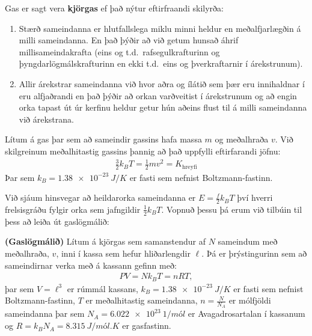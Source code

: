 \begin{tcolorbox}
\begin{definition}
Gas er sagt vera \textbf{kjörgas} ef það nýtur eftirfraandi skilyrða:
\begin{enumerate}[label = \textbf{(\roman*)}]
    \item Stærð sameindanna er hlutfallslega miklu minni heldur en meðalfjarlægðin á milli sameindanna. En það þýðir að við getum hunsað áhrif millisameindakrafta (eins og t.d.~rafsegulkrafturinn og þyngdarlögmálskrafturinn en ekki t.d.~eins og þverkraftarnir í árekstrunum).
    
    \item Allir árekstrar sameindanna við hvor aðra og ílátið sem þær eru innihaldnar í eru alfjaðrandi en það þýðir að orkan varðveitist í árekstrunum og að engin orka tapast út úr kerfinu heldur getur hún aðeins flust til á milli sameindanna við árekstrana.
\end{enumerate}
\end{definition}
\end{tcolorbox}

\begin{tcolorbox}
\begin{definition}
Lítum á gas þar sem að sameindir gassins hafa massa $m$ og meðalhraða $v$. Við skilgreinum meðalhitastig gassins þannig að það uppfylli eftirfarandi jöfnu:
\begin{align*}
  \frac{3}{2}k_B T = \frac{1}{2}mv^2 = K_{\text{hreyfi}}
\end{align*}
Þar sem $k_B = \SI{1.38e-23}{J/K}$ er fasti sem nefnist Boltzmann-fastinn.
\end{definition}
\end{tcolorbox}

Við sjáum hinsvegar að heildarorka sameindanna er $E = \frac{f}{2}k_B T$ því hverri frelsisgráðu fylgir orka sem jafngildir $\frac{1}{2}k_B T$. Vopnuð þessu þá erum við tilbúin til þess að leiða út gaslögmálið:


\begin{tcolorbox}
\begin{theorem}
\textbf{(Gaslögmálið)} Lítum á kjörgas sem samanstendur af $N$ sameindum með meðalhraða, $v$, inni í kassa sem hefur hliðarlengdir $\ell$. Þá er þrýstingurinn sem að sameindirnar verka með á kassann gefinn með:
\begin{align*}
    PV = N k_B T = nR T,
\end{align*}
þar sem $V = \ell^3$ er rúmmál kassans, $k_B = \SI{1.38e-23}{J/K}$ er fasti sem nefnist Boltzmann-fastinn, $T$ er meðalhitastig sameindanna, $n = \frac{N}{N_A}$ er mólfjöldi sameindanna þar sem $N_A = \SI{6.022e23}{1/mól}$ er Avagadrosartalan í kassanum og $R = k_B N_A = \SI{8.315}{J/mól.K}$ er gasfastinn.
\end{theorem}
\end{tcolorbox}

